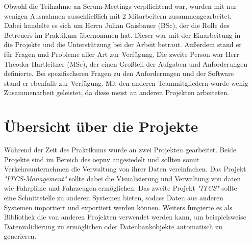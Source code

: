     Obwohl die Teilnahme an Scrum-Meetings verpflichtend war, wurden mit nur wenigen Ausnahmen ausschließlich mit 2 Mitarbeitern zusammengearbeitet. Dabei handelte es sich um Herrn Julian Gaisbauer 
    (BSc), der die Rolle des Betreuers im Praktikum übernommen hat. Dieser war mit der Einarbeitung in die Projekte und die Unterstützung bei der Arbeit betraut. Außerdem stand er für 
    Fragen und Probleme aller Art zur Verfügung. Die zweite Person war Herr Theodor Hartleitner (MSc), der einen Großteil der Aufgaben und Anforderungen definierte. Bei spezifischeren 
    Fragen zu den Anforderungen und der Software stand er ebenfalls zur Verfügung. Mit den anderen Teammitgliedern wurde wenig Zusammenarbeit geleistet, da diese meist an anderen Projekten arbeiteten.


\section{Übersicht über die Projekte}\label{sec:ueberblick-projekte}
    Während der Zeit des Praktikums wurde an zwei Projekten gearbeitet. Beide Projekte sind im Bereich des \gls{oepnv} angesiedelt und sollten somit Verkehrsunternehmen die Verwaltung von ihrer Daten 
    vereinfachen. Das Projekt \emph{"ITCS-Management"} sollte dabei die Visualisierung und Verwaltung von daten wie Fahrpläne und Fahrzeugen ermöglichen. Das zweite Projekt 
    \emph{"ITCS"} sollte eine Schnittstelle zu anderen Systemen bieten, sodass Daten aus anderen Systemen importiert und exportiert werden können. Weiters fungierte es als Bibliothek 
    die von anderen Projekten verwendet werden kann, um beispielsweise Datenvalidierung zu ermöglichen oder Datenbankobjekte automatisch zu generieren.

